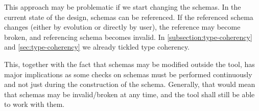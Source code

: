 This approach may be problematic if we start changing the schemas. In the current state of the design, schemas can be referenced. If the referenced schema changes (either by evolution or directly by user), the reference may become broken, and referencing schema becomes invalid. In \autoref{subsection:type-coherency} and \ref{sec:type-coherency} we already tickled type coherency.

This, together with the fact that schemas may be modified outside the tool, has major implications as some checks on schemas must be performed continuously and not just during the construction of the schema. Generally, that would mean that schemas may be invalid/broken at any time, and the tool shall still be able to work with them.